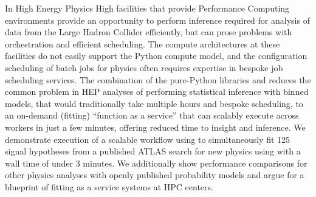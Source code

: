 In High Energy Physics High facilities that provide Performance Computing environments provide an opportunity to perform inference required for analysis of data from the Large Hadron Collider efficiently, but can prose problems with orchestration and efficient scheduling.
The compute architectures at these facilities do not easily support the Python compute model, and the configuration scheduling of batch jobs for physics often requires expertise in bespoke job scheduling services.
The combination of the pure-Python libraries \pyhf{} and \funcX{} reduces the common problem in HEP analyses of performing statistical inference with binned models, that would traditionally take multiple hours and bespoke scheduling, to an on-demand (fitting) ``function as a service'' that can scalably execute across workers in just a few minutes, offering reduced time to insight and inference.
We demonstrate execution of a scalable workflow using \funcX{} to simultaneously fit 125 signal hypotheses from a published ATLAS search for new physics using \pyhf{} with a wall time of under 3 minutes.
We additionally show performance comparisons for other physics analyses with openly published probability models and argue for a blueprint of fitting as a service systems at HPC centers.
